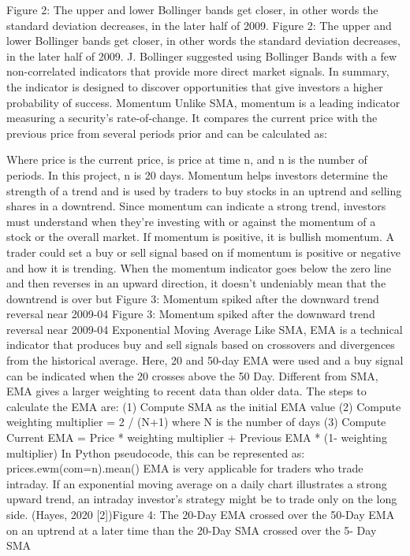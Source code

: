 \documentclass{article}
\begin{document}
Figure 2: The upper and lower Bollinger bands get closer, in other words the standard deviation decreases, in the later half of 2009.
Figure 2: The upper and lower Bollinger bands get closer, in other words the standard deviation decreases, in the later half of 2009.
J. Bollinger suggested using Bollinger Bands with a few non-correlated indicators that provide more direct market signals. In summary, the indicator is designed to discover opportunities that give investors a higher probability of success. 
Momentum
Unlike SMA, momentum is a leading indicator measuring a security's rate-of-change. It compares the current price with the previous price from several periods prior and can be calculated as:
 
Where price is the current price,  is price at time n, and n is the number of periods.
In this project, n is 20 days.
Momentum helps investors determine the strength of a trend and is used by traders to buy stocks in an uptrend and selling shares in a downtrend. Since momentum can indicate a strong trend, investors must understand when they're investing with or against the momentum of a stock or the overall market.
If momentum is positive, it is bullish momentum. A trader could set a buy or sell signal based on if momentum is positive or negative and how it is trending.
When the momentum indicator goes below the zero line and then reverses in an upward direction, it doesn't undeniably mean that the downtrend is over but Figure 3: Momentum spiked after the downward trend reversal near 2009-04
Figure 3: Momentum spiked after the downward trend reversal near 2009-04
Exponential Moving Average
Like SMA, EMA is a technical indicator that produces buy and sell signals based on crossovers and divergences from the historical average. Here, 20 and 50-day EMA were used and a buy signal can be indicated when the 20 crosses above the 50 Day.
Different from SMA, EMA gives a larger weighting to recent data than older data. The steps to calculate the EMA are:
(1) Compute SMA as the initial EMA value
(2) Compute weighting multiplier = 2 / (N+1) where N is the number of days
(3) Compute Current EMA = Price * weighting multiplier + Previous EMA * (1- weighting multiplier)
In Python pseudocode, this can be represented as: 
prices.ewm(com=n).mean()
EMA is very applicable for traders who trade intraday. If an exponential moving average on a daily chart illustrates a strong upward trend, an intraday investor’s strategy might be to trade only on the long side. (Hayes, 2020 [2])Figure 4: The 20-Day EMA crossed over the 50-Day EMA on an uptrend at a later time than the 20-Day SMA crossed over the 5- Day SMA
\end{document}
